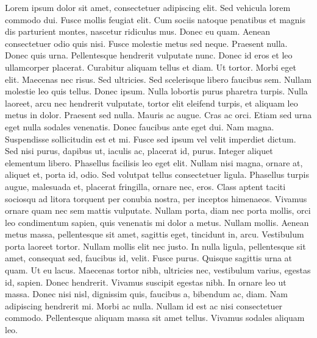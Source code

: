 Lorem ipsum dolor sit amet, consectetuer adipiscing elit. Sed vehicula
lorem commodo dui. Fusce mollis feugiat elit. Cum sociis natoque
penatibus et magnis dis parturient montes, nascetur ridiculus
mus. Donec eu quam. Aenean consectetuer odio quis nisi. Fusce molestie
metus sed neque. Praesent nulla. Donec quis urna. Pellentesque
hendrerit vulputate nunc. Donec id eros et leo ullamcorper
placerat. Curabitur aliquam tellus et diam. 
%
Ut tortor. Morbi eget elit. Maecenas nec risus. Sed ultricies. Sed
scelerisque libero faucibus sem. Nullam molestie leo quis
tellus. Donec ipsum. Nulla lobortis purus pharetra turpis. Nulla
laoreet, arcu nec hendrerit vulputate, tortor elit eleifend turpis, et
aliquam leo metus in dolor. Praesent sed nulla. Mauris ac augue. Cras
ac orci. Etiam sed urna eget nulla sodales venenatis. Donec faucibus
ante eget dui. Nam magna. Suspendisse sollicitudin est et mi. 
%
Fusce sed ipsum vel velit imperdiet dictum. Sed nisi purus, dapibus
ut, iaculis ac, placerat id, purus. Integer aliquet elementum
libero. Phasellus facilisis leo eget elit. Nullam nisi magna, ornare
at, aliquet et, porta id, odio. Sed volutpat tellus consectetuer
ligula. Phasellus turpis augue, malesuada et, placerat fringilla,
ornare nec, eros. Class aptent taciti sociosqu ad litora torquent per
conubia nostra, per inceptos himenaeos. Vivamus ornare quam nec sem
mattis vulputate. Nullam porta, diam nec porta mollis, orci leo
condimentum sapien, quis venenatis mi dolor a metus. Nullam
mollis. Aenean metus massa, pellentesque sit amet, sagittis eget,
tincidunt in, arcu. Vestibulum porta laoreet tortor. Nullam mollis
elit nec justo. In nulla ligula, pellentesque sit amet, consequat sed,
faucibus id, velit. Fusce purus. Quisque sagittis urna at quam. Ut eu
lacus. Maecenas tortor nibh, ultricies nec, vestibulum varius, egestas
id, sapien. 
%
Donec hendrerit. Vivamus suscipit egestas nibh. In ornare leo ut
massa. Donec nisi nisl, dignissim quis, faucibus a, bibendum ac,
diam. Nam adipiscing hendrerit mi. Morbi ac nulla. Nullam id est ac
nisi consectetuer commodo. Pellentesque aliquam massa sit amet
tellus. Vivamus sodales aliquam leo. 
